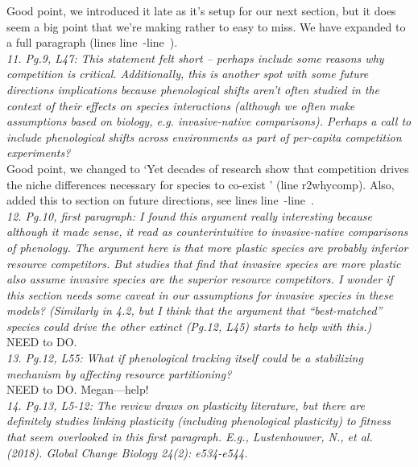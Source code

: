 \documentclass[11pt]{article}
\newcommand{\lr}[1]{line~\lineref{#1}}
\begin{document}
Good point, we introduced it late as it's setup for our next section, but it does seem a big point that we're making rather to easy to miss. We have expanded to a full paragraph (lines \lr{r2expand}-\lr{r2expandend}).\\

\emph{11.     Pg.9, L47: This statement felt short – perhaps include some reasons why competition
is critical. Additionally, this is another spot with some future directions implications
because phenological shifts aren't often studied in the context of their effects on species
interactions (although we often make assumptions based on biology, e.g. invasive-native
comparisons). Perhaps a call to include phenological shifts across environments as part of
per-capita competition experiments?}\\

Good point, we changed to `Yet decades of research show that competition drives the niche differences necessary for species to co-exist \citep{Hutchinson:1959xi,Chesson:2000vd}' (line {r2whycomp}). Also, added this to section on future directions, see lines \lr{r2exp}-\lr{r2expend}.\\

\emph{12.     Pg.10, first paragraph: I found this argument really interesting because although it
made sense, it read as counterintuitive to invasive-native comparisons of phenology. The
argument here is that more plastic species are probably inferior resource competitors. But
studies that find that invasive species are more plastic also assume invasive species are the
superior resource competitors. I wonder if this section needs some caveat in our assumptions
for invasive species in these models? (Similarly in 4.2, but I think that the argument that
``best-matched'' species could drive the other extinct (Pg.12, L45) starts to help with this.)}\\

NEED to DO. \\

\emph{13.     Pg.12, L55: What if phenological tracking itself could be a stabilizing mechanism by
affecting resource partitioning?}\\

NEED to DO. Megan---help!\\

\emph{14.     Pg.13, L5-12: The review draws on plasticity literature, but there are definitely
studies linking plasticity (including phenological plasticity) to fitness that seem
overlooked in this first paragraph. E.g., Lustenhouwer, N., et al. (2018). Global Change
Biology 24(2): e534-e544.}\\
\end{document}
